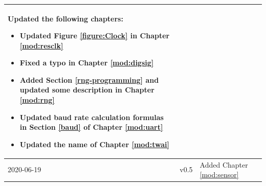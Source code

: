 \begin{longtable}[l]{ | m{2cm} | m{1.5cm} | m{12cm} | }
    Updated the following chapters:
    \begin{itemize}
        \item Updated Figure \ref{figure:Clock} in Chapter
        \ref{mod:resclk} \textit{\nameref{mod:resclk}}
        \item Fixed a typo in Chapter \ref{mod:digsig} \textit{\nameref{mod:digsig}}
        \item Added Section \ref{rng-programming} \textit{\nameref{rng-programming}} and updated some description in Chapter \ref{mod:rng} \textit{\nameref{mod:rng}}
        \item Updated baud rate calculation formulas in Section \ref{baud} \textit{\nameref{baud}} of Chapter \ref{mod:uart} \textit{\nameref{mod:uart}}
        \item Updated the name of Chapter \ref{mod:twai} \textit{\nameref{mod:twai}}
    \vspace{-1em}
    \end{itemize}
    \\\hline
    2020-06-19 & v0.5 &
    Added Chapter \ref{mod:sensor} \textit{\nameref{mod:sensor}}


\end{longtable}
